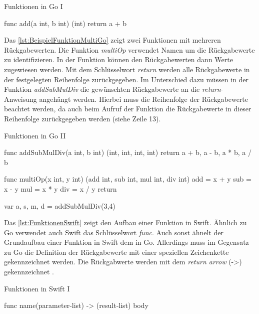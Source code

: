 \begin{listing}[H]
\caption{Funktionen in Go I}
\label{lst:BeispielFunktionGo}
\begin{GoCode}
func add(a int, b int) (int) {
    return a + b
}
\end{GoCode}
\end{listing}

Das \autoref{lst:BeispielFunktionMultiGo} zeigt zwei Funktionen mit mehreren Rückgabewerten.
Die Funktion \emph{multiOp} verwendet Namen um die Rückgabewerte zu identifizieren.
In der Funktion können den Rückgabewerten dann Werte zugewiesen werden.
Mit dem Schlüsselwort \emph{return} werden alle Rückgabewerte in der festgelegten Reihenfolge zurückgegeben.
Im Unterschied dazu müssen in der Funktion \emph{addSubMulDiv} die gewünschten Rückgabewerte an die \emph{return}-Anweisung angehängt werden.
Hierbei muss die Reihenfolge der Rückgabewerte beachtet werden, da auch beim Aufruf der Funktion die Rückgabewerte in dieser Reihenfolge zurückgegeben werden (siehe Zeile 13). 

\begin{listing}[H]
\caption{Funktionen in Go II}
\label{lst:BeispielFunktionMultiGo}
\begin{GoCode}
func addSubMulDiv(a int, b int) (int, int, int, int){
    return a + b, a - b, a * b, a / b
}

func multiOp(x int, y int) (add int, sub int, mul int, div int){
    add = x + y
    sub = x - y
    mul = x * y
    div = x / y
    return
}

var a, s, m, d = addSubMulDiv(3,4)
\end{GoCode}
\end{listing}

Das \autoref{lst:FunktionenSwift} zeigt den Aufbau einer Funktion in Swift. 
Ähnlich zu Go verwendet auch Swift das Schlüsselwort \emph{func}.
Auch sonst ähnelt der Grundaufbau einer Funktion in Swift dem in Go.
Allerdings muss im Gegensatz zu Go die Definition der Rückgabewerte mit einer speziellen Zeichenkette gekennzeichnet werden.
Die Rückgabwerte werden mit dem \emph{return arrow} (->) gekennzeichnet \cite{Apple.2017}.

\begin{listing}[H]
\caption{Funktionen in Swift I}
\label{lst:FunktionenSwift}
\begin{SwiftCode}
func name(parameter-list) -> (result-list){
    body
}
\end{SwiftCode}
\end{listing}


